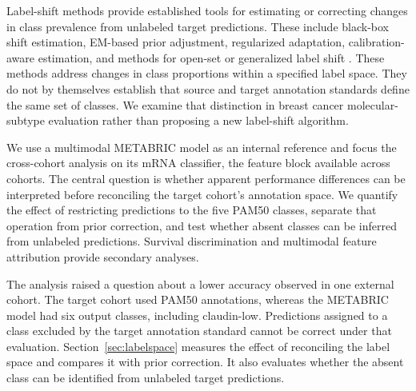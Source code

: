 \documentclass[11pt,a4paper]{article}
\begin{document}
Label-shift methods provide established tools for estimating or correcting changes in class prevalence from unlabeled target predictions. These include black-box shift estimation, EM-based prior adjustment, regularized adaptation, calibration-aware estimation, and methods for open-set or generalized label shift \citep{lipton2018detecting,azizzadenesheli2019regularized,saerens2002adjusting,alexandari2020maximum,garg2020unified,garg2022open,tachetdescombes2020domain}. These methods address changes in class proportions within a specified label space. They do not by themselves establish that source and target annotation standards define the same set of classes. We examine that distinction in breast cancer molecular-subtype evaluation rather than proposing a new label-shift algorithm.

We use a multimodal METABRIC model as an internal reference and focus the cross-cohort analysis on its mRNA classifier, the feature block available across cohorts. The central question is whether apparent performance differences can be interpreted before reconciling the target cohort's annotation space. We quantify the effect of restricting predictions to the five PAM50 classes, separate that operation from prior correction, and test whether absent classes can be inferred from unlabeled predictions. Survival discrimination and multimodal feature attribution provide secondary analyses.

The analysis raised a question about a lower accuracy observed in one external cohort. The target cohort used PAM50 annotations, whereas the METABRIC model had six output classes, including claudin-low. Predictions assigned to a class excluded by the target annotation standard cannot be correct under that evaluation. Section~\ref{sec:labelspace} measures the effect of reconciling the label space and compares it with prior correction. It also evaluates whether the absent class can be identified from unlabeled target predictions.
\end{document}
